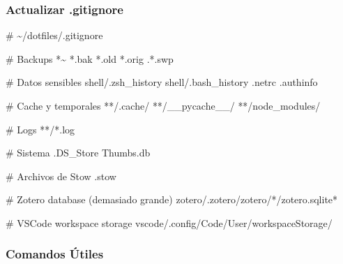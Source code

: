 \documentclass[
  doc,
  floatsintext,
  longtable,
  a4paper,
  nolmodern,
  notxfonts,
  notimes,
  12pt,
  colorlinks=true,linkcolor=blue,citecolor=blue,urlcolor=blue]{apa7}
\newenvironment{Shaded}{\begin{snugshade}}{\end{snugshade}}
\newcommand{\BuiltInTok}[1]{\textcolor[rgb]{0.00,0.23,0.31}{#1}}
\newcommand{\CommentTok}[1]{\textcolor[rgb]{0.37,0.37,0.37}{#1}}
\newcommand{\ExtensionTok}[1]{\textcolor[rgb]{0.00,0.23,0.31}{#1}}
\newcommand{\NormalTok}[1]{\textcolor[rgb]{0.00,0.23,0.31}{#1}}
\newcommand{\PreprocessorTok}[1]{\textcolor[rgb]{0.68,0.00,0.00}{#1}}
\begin{document}
\subsubsection{Actualizar .gitignore}\label{actualizar-.gitignore}

\begin{Shaded}
\begin{Highlighting}[]
\CommentTok{\# \textasciitilde{}/dotfiles/.gitignore}

\CommentTok{\# Backups}
\ExtensionTok{*\textasciitilde{}}
\ExtensionTok{*.bak}
\ExtensionTok{*.old}
\ExtensionTok{*.orig}
\BuiltInTok{.}\PreprocessorTok{*}\NormalTok{.swp}

\CommentTok{\# Datos sensibles}
\ExtensionTok{shell/.zsh\_history}
\ExtensionTok{shell/.bash\_history}
\ExtensionTok{.netrc}
\ExtensionTok{.authinfo}

\CommentTok{\# Cache y temporales}
\ExtensionTok{**/.cache/}
\ExtensionTok{**/\_\_pycache\_\_/}
\ExtensionTok{**/node\_modules/}

\CommentTok{\# Logs}
\ExtensionTok{**/*.log}

\CommentTok{\# Sistema}
\ExtensionTok{.DS\_Store}
\ExtensionTok{Thumbs.db}

\CommentTok{\# Archivos de Stow}
\ExtensionTok{.stow}

\CommentTok{\# Zotero database (demasiado grande)}
\ExtensionTok{zotero/.zotero/zotero/*/zotero.sqlite*}

\CommentTok{\# VSCode workspace storage}
\ExtensionTok{vscode/.config/Code/User/workspaceStorage/}
\end{Highlighting}
\end{Shaded}

\subsubsection{Comandos Útiles}\label{comandos-uxfatiles}
\end{document}
